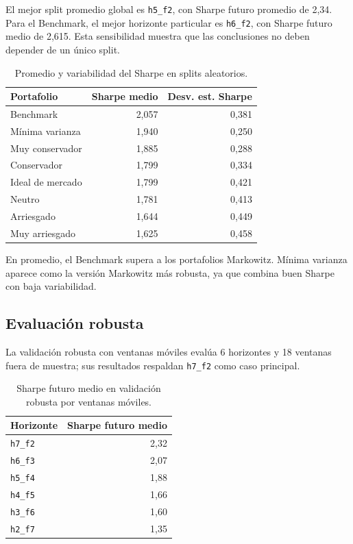 El mejor split promedio global es \texttt{h5\_f2}, con Sharpe futuro promedio de
2,34. Para el Benchmark, el mejor horizonte particular es \texttt{h6\_f2}, con
Sharpe futuro medio de 2,615. Esta sensibilidad muestra que las conclusiones no
deben depender de un \'unico split.

\begin{table}[H]
\centering
\caption{Promedio y variabilidad del Sharpe en splits aleatorios.}
\label{tab:anexo4_splits_sharpe}
\small
\begin{tabular}{@{}lrr@{}}
\toprule
Portafolio & Sharpe medio & Desv. est. Sharpe \\
\midrule
Benchmark & 2,057 & 0,381 \\
M\'inima varianza & 1,940 & 0,250 \\
Muy conservador & 1,885 & 0,288 \\
Conservador & 1,799 & 0,334 \\
Ideal de mercado & 1,799 & 0,421 \\
Neutro & 1,781 & 0,413 \\
Arriesgado & 1,644 & 0,449 \\
Muy arriesgado & 1,625 & 0,458 \\
\bottomrule
\end{tabular}
\end{table}

En promedio, el Benchmark supera a los portafolios Markowitz. M\'inima varianza
aparece como la versi\'on Markowitz m\'as robusta, ya que combina buen Sharpe con
baja variabilidad.

\subsection*{Evaluaci\'on robusta}

La validaci\'on robusta con ventanas m\'oviles eval\'ua 6 horizontes y 18 ventanas
fuera de muestra; sus resultados respaldan \texttt{h7\_f2} como caso principal.

\begin{table}[H]
\centering
\caption{Sharpe futuro medio en validaci\'on robusta por ventanas m\'oviles.}
\label{tab:anexo4_validacion_robusta}
\small
\begin{tabular}{@{}lr@{}}
\toprule
Horizonte & Sharpe futuro medio \\
\midrule
\texttt{h7\_f2} & 2,32 \\
\texttt{h6\_f3} & 2,07 \\
\texttt{h5\_f4} & 1,88 \\
\texttt{h4\_f5} & 1,66 \\
\texttt{h3\_f6} & 1,60 \\
\texttt{h2\_f7} & 1,35 \\
\bottomrule
\end{tabular}
\end{table}


